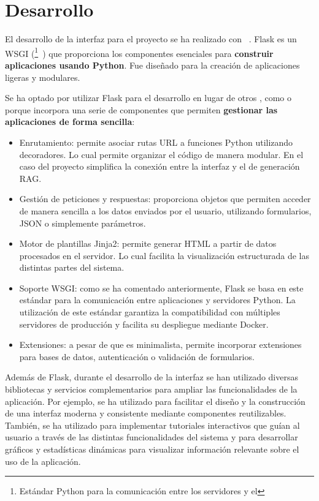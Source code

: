 \section{Desarrollo }
El desarrollo de la interfaz  para el proyecto se ha realizado con ~\cite{herramienta:flask}. Flask es un  WSGI (\footnote{Estándar Python para la comunicación entre los servidores  y el }~\cite{herramienta:wsgi}) que proporciona los componentes esenciales para \textbf{construir aplicaciones  usando Python}. Fue diseñado para la creación de aplicaciones  ligeras y modulares. 

Se ha optado por utilizar Flask para el desarrollo  en lugar de otros , como  o  porque incorpora una serie de componentes que permiten \textbf{gestionar las aplicaciones  de forma sencilla}:
\begin{itemize}
\tightlist
	\item Enrutamiento: permite asociar rutas URL a funciones Python utilizando decoradores. Lo cual permite organizar el código de manera modular. En el caso del proyecto simplifica la conexión entre la interfaz  y el  de generación RAG.
	\item Gestión de peticiones y respuestas: proporciona objetos que permiten acceder de manera sencilla a los datos enviados por el usuario, utilizando formularios, JSON o simplemente parámetros.
	\item Motor de plantillas Jinja2: permite generar HTML a partir de datos procesados en el servidor. Lo cual facilita la visualización estructurada de las distintas partes del sistema.
	\item Soporte WSGI: como se ha comentado anteriormente, Flask se basa en este estándar para la comunicación entre aplicaciones  y servidores Python. La utilización de este estándar garantiza la compatibilidad con múltiples servidores de producción y facilita su despliegue mediante Docker.
	\item Extensiones: a pesar de que es minimalista, permite incorporar extensiones para bases de datos, autenticación o validación de formularios.
\end{itemize}  

Además de Flask, durante el desarrollo de la interfaz  se han utilizado diversas bibliotecas y servicios complementarios para ampliar las funcionalidades de la aplicación. Por ejemplo, se ha utilizado  para facilitar el diseño  y la construcción de una interfaz moderna y consistente mediante componentes reutilizables. También, se ha utilizado  para implementar tutoriales interactivos que guían al usuario a través de las distintas funcionalidades del sistema y  para desarrollar gráficos y estadísticas dinámicas para visualizar información relevante sobre el uso de la aplicación.

